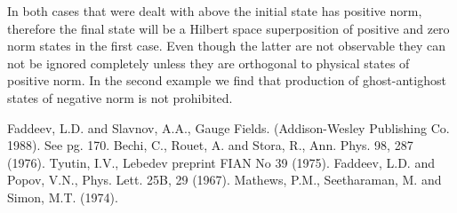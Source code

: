 \documentclass[a4paper,12pt]{article}
\begin{document}
In both cases that were dealt with above the initial state has positive norm, therefore the final state will be a Hilbert space superposition of positive and zero norm states in the first case.  Even though the latter are not observable they can not be ignored completely unless they are orthogonal to physical states of positive norm.  In the second example we find that production of ghost-antighost states of negative norm is not prohibited.

\newpage
\begin{thebibliography}{99}
Faddeev, L.D. and Slavnov, A.A., Gauge Fields.  (Addison-Wesley Publishing Co. 1988). See pg. 170.
Bechi, C., Rouet, A. and Stora, R., Ann. Phys. 98, 287 (1976).
Tyutin, I.V., Lebedev preprint FIAN No 39 (1975).
Faddeev, L.D. and Popov, V.N., Phys. Lett. 25B, 29 (1967).
Mathews, P.M., Seetharaman, M. and Simon, M.T. (1974).
\end{thebibliography}
\end{document}
